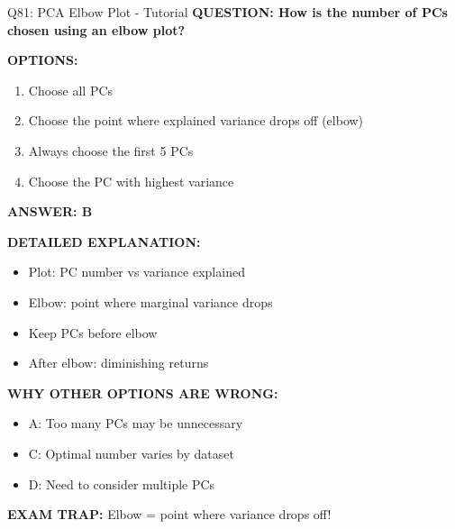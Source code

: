 \documentclass[8pt]{beamer}
\begin{document}
	\begin{frame}{Q81: PCA Elbow Plot - Tutorial}
		\fontsize{6.5}{7.5}\selectfont
		\textbf{QUESTION: How is the number of PCs chosen using an elbow plot?}
		
		\vspace{0.1cm}
		\textbf{OPTIONS:}
		\begin{enumerate}
			\item Choose all PCs
			\item Choose the point where explained variance drops off (elbow)
			\item Always choose the first 5 PCs
			\item Choose the PC with highest variance
		\end{enumerate}
		
		\vspace{0.1cm}
		\textcolor{myblue}{\textbf{ANSWER: B}}
		
		\vspace{0.1cm}
		\textbf{DETAILED EXPLANATION:}
		\begin{itemize}
			\item Plot: PC number vs variance explained
			\item Elbow: point where marginal variance drops
			\item Keep PCs before elbow
			\item After elbow: diminishing returns
		\end{itemize}
		
		\vspace{0.1cm}
		\textcolor{myred}{\textbf{WHY OTHER OPTIONS ARE WRONG:}}
		\begin{itemize}
			\item \textcolor{myred}{A:} Too many PCs may be unnecessary
			\item \textcolor{myred}{C:} Optimal number varies by dataset
			\item \textcolor{myred}{D:} Need to consider multiple PCs
		\end{itemize}
		
		\textcolor{myred}{\textbf{EXAM TRAP:}} Elbow = \textcolor{myblue}{point where variance drops off}!
	\end{frame}
	
\end{document}
